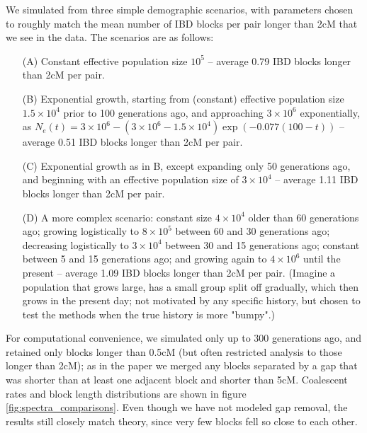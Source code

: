 \documentclass{article}
\begin{document}
We simulated from three simple demographic scenarios,
with parameters chosen to roughly match the mean number of IBD blocks per pair longer than 2cM that we see in the data.
The scenarios are as follows:
\begin{itemize}
    \item[(A)] Constant effective population size $10^5$ -- average 0.79 IBD blocks longer than 2cM per pair.
    \item[(B)] Exponential growth, starting from (constant) effective population size $1.5 \times 10^4$ prior to 100 generations ago,
        and approaching $3\times 10^6$ exponentially, as $N_e(t) = 3 \times 10^6 - (3 \times 10^6 - 1.5 \times 10^4) \exp(-0.077(100-t))$
        -- average 0.51 IBD blocks longer than 2cM per pair.
    \item[(C)] Exponential growth as in B, except expanding only 50 generations ago, and beginning with an effective population size of $3 \times 10^4$
      -- average 1.11 IBD blocks longer than 2cM per pair.
    \item[(D)] A more complex scenario: constant size $4\times10^4$ older than 60 generations ago;
      growing logistically to $8\times10^5$ between 60 and 30 generations ago;
      decreasing logistically to $3\times10^4$ between 30 and 15 generations ago;
      constant between 5 and 15 generations ago;
      and growing again to $4\times10^6$ until the present -- average 1.09 IBD blocks longer than 2cM per pair.
      (Imagine a population that grows large, has a small group split off gradually, which then grows in the present day;
      not motivated by any specific history, but chosen to test the methods when the true history is more "bumpy".)
\end{itemize}
For computational convenience, we simulated only up to 300 generations ago,
and retained only blocks longer than 0.5cM (but often restricted analysis to those longer than 2cM);
as in the paper we merged any blocks separated by a gap that was shorter than at least one adjacent block and shorter than 5cM.
Coalescent rates and block length distributions are shown in figure \ref{fig:spectra_comparisons}.
Even though we have not modeled gap removal, the results still closely match theory,
since very few blocks fell so close to each other.
\end{document}
